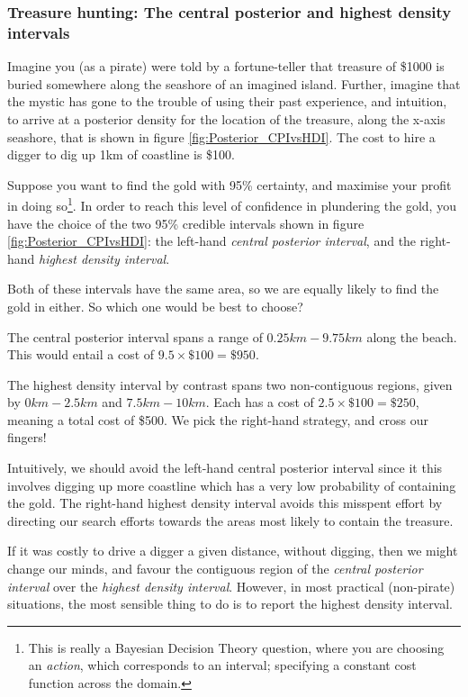 \documentclass[11pt,fullpage]{book}
\begin{document}
\subsubsection{Treasure hunting: The central posterior and highest density intervals}\label{sec:Posterior_CPI}\label{sec:Posterior_HDI}
Imagine you (as a pirate) were told by a fortune-teller that treasure of \$1000 is buried somewhere along the seashore of an imagined island. Further, imagine that the mystic has gone to the trouble of using their past experience, and intuition, to arrive at a posterior density for the location of the treasure, along the x-axis seashore, that is shown in figure \ref{fig:Posterior_CPIvsHDI}. The cost to hire a digger to dig up 1km of coastline is \$100.

Suppose you want to find the gold with 95\% certainty, and maximise your profit in doing so\footnote{This is really a Bayesian Decision Theory question, where you are choosing an \textit{action}, which corresponds to an interval; specifying a constant cost function across the domain.}. In order to reach this level of confidence in plundering the gold, you have the choice of the two 95\% credible intervals shown in figure \ref{fig:Posterior_CPIvsHDI}: the left-hand \textit{central posterior interval}, and the right-hand \textit{highest density interval}.

Both of these intervals have the same area, so we are equally likely to find the gold in either. So which one would be best to choose?

The central posterior interval spans a range of $0.25km-9.75km$ along the beach. This would entail a cost of $9.5\times \$100 = \$950$.

The highest density interval by contrast spans two non-contiguous regions, given by $0km-2.5km$ and $7.5km-10km$. Each has a cost of $2.5\times\$100 = \$250$, meaning a total cost of \$500. We pick the right-hand strategy, and cross our fingers!

Intuitively, we should avoid the left-hand central posterior interval since it this involves digging up more coastline which has a very low probability of containing the gold. The right-hand highest density interval avoids this misspent effort by directing our search efforts towards the areas most likely to contain the treasure.

If it was costly to drive a digger a given distance, without digging, then we might change our minds, and favour the contiguous region of the \textit{central posterior interval} over the \textit{highest density interval}. However, in most practical (non-pirate) situations, the most sensible thing to do is to report the highest density interval.
\end{document}
